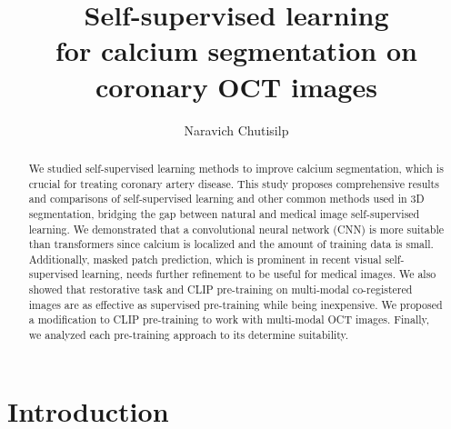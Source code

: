 \documentclass[a4paper,11pt,oneside]{report}
\title{Self-supervised learning\\for calcium segmentation on coronary OCT images}
\author{Naravich Chutisilp}
\begin{document}
\maketitle
\makededication
\makeacks

\begin{abstract}


We studied self-supervised learning methods to improve calcium segmentation, which is crucial for treating coronary artery disease. 
This study proposes comprehensive results and comparisons of self-supervised learning and other common methods used in 3D segmentation, bridging the gap between natural and medical image self-supervised learning. We demonstrated that a convolutional neural network (CNN) is more suitable than transformers since calcium is localized and the amount of training data is small. Additionally, masked patch prediction, which is prominent in recent visual self-supervised learning, needs further refinement to be useful for medical images. We also showed that restorative task and CLIP pre-training on multi-modal co-registered images are as effective as supervised pre-training while being inexpensive. We proposed a modification to CLIP pre-training to work with multi-modal OCT images. Finally, we analyzed each pre-training approach to its determine suitability.
\end{abstract}

\maketoc

\chapter{Introduction}

\end{document}
